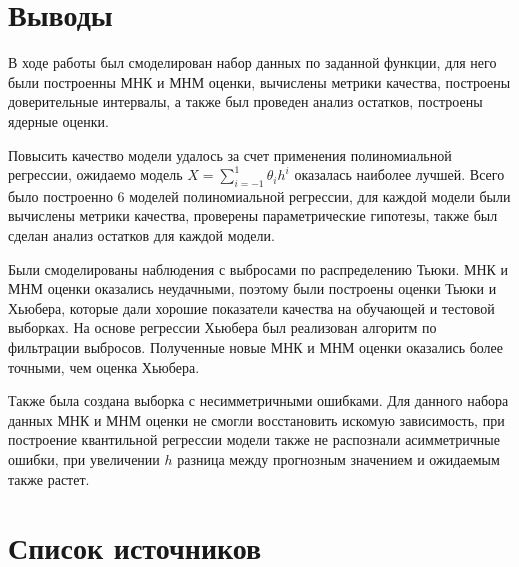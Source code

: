 \documentclass[a4paper,12pt]{article}
\begin{document}
\section{Выводы}

В ходе работы был смоделирован набор данных по заданной функции, для него были построенны МНК и МНМ оценки, вычислены метрики качества, построены доверительные интервалы, а также был проведен анализ остатков, построены ядерные оценки.

Повысить качество модели удалось за счет применения полиномиальной регрессии, ожидаемо модель $X=\sum\limits_{i=-1}^1 \theta_i h^i$ оказалась наиболее лучшей. Всего было построенно 6 моделей полиномиальной регрессии, для каждой модели были вычислены метрики качества, проверены параметрические гипотезы, также был сделан анализ остатков для каждой модели.

Были смоделированы наблюдения с выбросами по распределению Тьюки. МНК и МНМ оценки оказались неудачными, поэтому были построены оценки Тьюки и Хьюбера, которые дали хорошие показатели качества на обучающей и тестовой выборках. На основе регрессии Хьюбера был реализован алгоритм по фильтрации выбросов. Полученные новые МНК и МНМ оценки оказались более точными, чем оценка Хьюбера.

Также была создана выборка с несимметричными ошибками. Для данного набора данных МНК и МНМ оценки не смогли восстановить искомую зависимость, при построение квантильной регрессии модели также не распознали асимметричные ошибки, при увеличении $h$ разница между прогнозным значением и ожидаемым также растет.




\section{Список источников}
\end{document}

